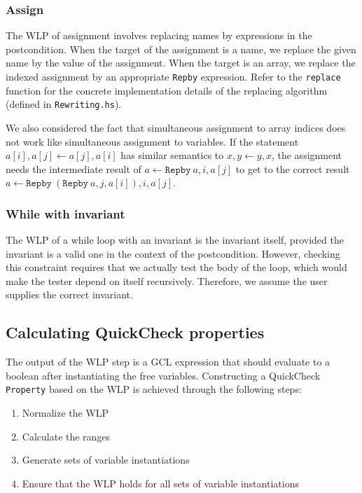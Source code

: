 \documentclass[a4paper]{article}
\begin{document}

\subsubsection*{Assign}

The WLP of assignment involves replacing names by expressions in the postcondition.
When the target of the assignment is a name, we replace the given name by the value
of the assignment. When the target is an array, we replace the indexed
assignment by an appropriate \texttt{Repby} expression. Refer to the
\texttt{replace} function for the concrete implementation details of the
replacing algorithm (defined in \texttt{Rewriting.hs}).

We also considered the fact that simultaneous assignment to array indices does
not work like simultaneous assignment to variables. If the statement 
$a[i], a[j] \gets a[j], a[i]$ has similar semantics to $x, y \gets y, x$, the
assignment needs the intermediate result of
$a \gets \texttt{Repby}\ a, i, a[j]$ to get to the correct result
$a \gets \texttt{Repby}\ (\texttt{Repby}\ a, j, a[i]), i, a[j]$.

\subsubsection*{While with invariant}

The WLP of a while loop with an invariant is the invariant itself, provided the
invariant is a valid one in the context of the postcondition. However, checking
this constraint requires that we actually test the body of the loop, which
would make the tester depend on itself recursively. Therefore, we assume the
user supplies the correct invariant.

\subsection{Calculating QuickCheck properties}

The output of the WLP step is a GCL expression that should evaluate to a boolean
after instantiating the free variables. Constructing a QuickCheck \texttt{Property}
based on the WLP is achieved through the following steps:

\begin{enumerate}
\item Normalize the WLP
\item Calculate the ranges
\item Generate sets of variable instantiations
\item Ensure that the WLP holds for all sets of variable instantiations
\end{enumerate}
\end{document}
